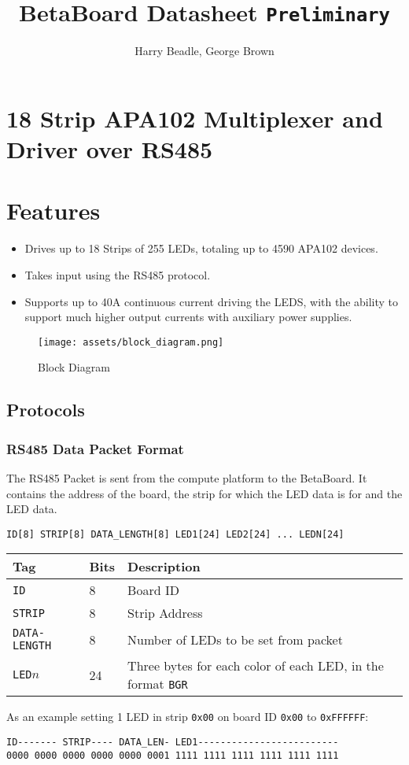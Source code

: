 \documentclass[a4paper]{article}
\title{BetaBoard Datasheet \texttt{Preliminary}}
\author{Harry Beadle, George Brown}
\begin{document}
\maketitle

\section*{18 Strip APA102 Multiplexer and Driver over RS485}

\section{Features}
\begin{itemize}
\item Drives up to 18 Strips of 255 LEDs, totaling up to 4590 APA102 devices.
\item Takes input using the RS485 protocol.
\item Supports up to 40A continuous current driving the LEDS, with the ability to support much higher output currents with auxiliary power supplies.
\end{itemize}

\begin{figure}[H]
\centering
\texttt{[image: assets/block\_diagram.png]}
\caption{Block Diagram}
\end{figure}

\subsection{Protocols}\label{protocols}

\subsubsection{RS485 Data Packet Format}\label{rs485-data-packet-format}

The RS485 Packet is sent from the compute platform to the BetaBoard. It
contains the address of the board, the strip for which the LED data is
for and the LED data.

\begin{center}
\begin{verbatim}
ID[8] STRIP[8] DATA_LENGTH[8] LED1[24] LED2[24] ... LEDN[24]
\end{verbatim}

\begin{table}[H]
\begin{tabular}{lll}
Tag & Bits & Description \\
\hline
\texttt{ID} & 8 & Board ID  \\
\texttt{STRIP} & 8 & Strip Address  \\
\texttt{DATA-LENGTH} & 8 & Number of LEDs to be set from packet \\
\texttt{LED}$n$ & 24 & Three bytes for each color of each LED, in the format \texttt{BGR}
\end{tabular}
\end{table}
\end{center}

As an example setting 1 LED in strip \texttt{0x00} on board ID \texttt{0x00} to \texttt{0xFFFFFF}:

\begin{verbatim}
ID------- STRIP---- DATA_LEN- LED1-------------------------
0000 0000 0000 0000 0000 0001 1111 1111 1111 1111 1111 1111
\end{verbatim}
\end{document}
